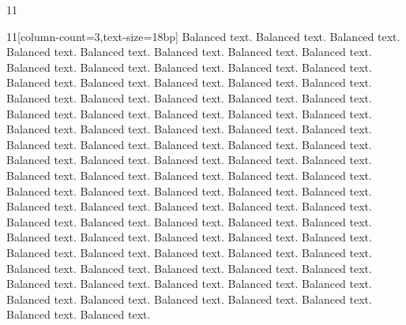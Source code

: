 \documentclass[paper={180mm,100mm}]{ropas-poster}
\begin{document}
\begin{postergrid}{1}{1}
\begin{posterblock}{1}{1}[column-count=3,text-size=18bp]
Balanced text. Balanced text. Balanced text. Balanced text. Balanced text. Balanced text. Balanced text. Balanced text. Balanced text. Balanced text. Balanced text. Balanced text. Balanced text. Balanced text. Balanced text. Balanced text. Balanced text. Balanced text. Balanced text. Balanced text. Balanced text. Balanced text. Balanced text. Balanced text. Balanced text. Balanced text. Balanced text. Balanced text. Balanced text. Balanced text. Balanced text. Balanced text. Balanced text. Balanced text. Balanced text. Balanced text. Balanced text. Balanced text. Balanced text. Balanced text. Balanced text. Balanced text. Balanced text. Balanced text. Balanced text. Balanced text. Balanced text. Balanced text. Balanced text. Balanced text. Balanced text. Balanced text. Balanced text. Balanced text. Balanced text. Balanced text. Balanced text. Balanced text. Balanced text. Balanced text. Balanced text. Balanced text. Balanced text. Balanced text. Balanced text. Balanced text. Balanced text. Balanced text. Balanced text. Balanced text. Balanced text. Balanced text. Balanced text. Balanced text. Balanced text. Balanced text. Balanced text. Balanced text. Balanced text. Balanced text. Balanced text. Balanced text. Balanced text. Balanced text. Balanced text. Balanced text. Balanced text. Balanced text. Balanced text. Balanced text. 
\end{posterblock}
\end{postergrid}
\end{document}
